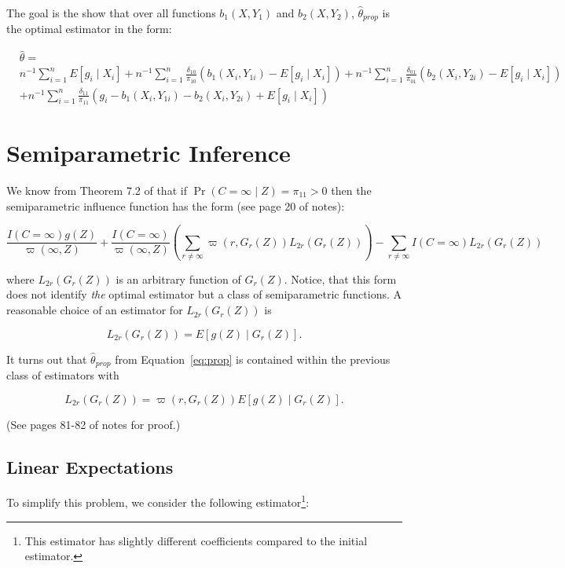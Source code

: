 \documentclass[12pt]{article}
\begin{document}
The goal is the show that over all functions $b_1(X, Y_1)$ and $b_2(X, Y_2)$,
$\hat \theta_{prop}$ is the optimal estimator in the form:

\begin{align}
  &\hat \theta =\\ \nonumber
  &n^{-1} \sum_{i = 1}^n E[g_i \mid X_i] + n^{-1} \sum_{i = 1}^n
  \frac{\delta_{10}}{\pi_{10}} (b_1(X_i, Y_{1i}) - E[g_i \mid X_i]) 
  + n^{-1} \sum_{i = 1}^n \frac{\delta_{01}}{\pi_{01}} (b_2(X_i, Y_{2i}) - E[g_i \mid X_i]) \\ \nonumber
  &+ n^{-1} \sum_{i = 1}^n \frac{\delta_{11}}{\pi_{11}} (g_i - b_1(X_i, Y_{1i}) - b_2(X_i, Y_{2i}) + E[g_i \mid X_i])
\end{align}

\section*{Semiparametric Inference}

We know from Theorem 7.2 of \cite{tsiatis2006semiparametric} that if $\Pr(C =
\infty \mid Z) = \pi_{11} > 0$ 
then the semiparametric influence function has the form (see page 20 of notes):

\[ \frac{I(C = \infty) g(Z)}{\varpi(\infty, Z)} + \frac{I(C =
  \infty)}{\varpi(\infty, Z)} \left(\sum_{r \neq \infty} \varpi(r, G_r(Z))
  L_{2r}(G_r(Z))\right) - \sum_{r \neq \infty} I(C = \infty)L_{2r}(G_r(Z))\]

where $L_{2r}(G_r(Z))$ is an arbitrary function of $G_r(Z)$. Notice, that this
form does not identify \textit{the} optimal estimator but a class of 
semiparametric functions. A reasonable choice of an estimator for $L_{2r}(G_r(Z))$ is

\[L_{2r}(G_r(Z)) = E[g(Z) \mid G_r(Z)].\]

It turns out that $\hat \theta_{prop}$ from Equation~\ref{eq:prop} is contained within 
the previous class of estimators with 

\[L_{2r}(G_r(Z)) = \varpi(r, G_r(Z)) E[g(Z) \mid G_r(Z)].\]

(See pages 81-82 of notes for proof.) \\

\subsection*{Linear Expectations}

To simplify this problem, we consider the following estimator\footnote{This
estimator has slightly different coefficients compared to the initial
estimator.}:
\end{document}

